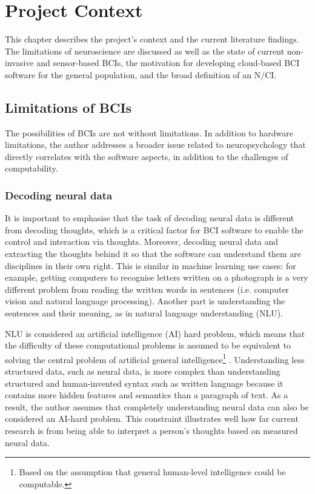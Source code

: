\chapter{Project Context}
\graphicspath{{Chapter2/Figs/}{Chapter2/Figs/}}

This chapter describes the project’s context and the current literature findings. The limitations of neuroscience are discussed as well as the state of current non-invasive and sensor-based BCIs, the motivation for developing cloud-based BCI software for the general population, and the broad definition of an N/CI.

\section{Limitations of BCIs}
\label{chapter2-limitations-of-bcis}

The possibilities of BCIs are not without limitations. In addition to hardware limitations, the author addresses a broader issue related to neuropsychology that directly correlates with the software aspects, in addition to the challenges of computability.

\subsection{Decoding neural data}
\label{chapter2-decoding-neural-data}

It is important to emphasise that the task of decoding neural data is different from decoding thoughts, which is a critical factor for BCI software to enable the control and interaction via thoughts. Moreover, decoding neural data and extracting the thoughts behind it so that the software can understand them are disciplines in their own right. This is similar in machine learning use cases: for example, getting computers to recognise letters written on a photograph is a very different problem from reading the written words in sentences (i.e. computer vision and natural language processing). Another part is understanding the sentences and their meaning, as in natural language understanding (NLU).

NLU is considered an artificial intelligence (AI) hard problem, which means that the difficulty of these computational problems is assumed to be equivalent to solving the central problem of artificial general intelligence\footnote{Based on the assumption that general human-level intelligence could be computable.} \citep{demasi_theoretical_2010}. Understanding less structured data, such as neural data, is more complex than understanding structured and human-invented syntax such as written language because it contains more hidden features and semantics than a paragraph of text. As a result, the author assumes that completely understanding neural data can also be considered an AI-hard problem. This constraint illustrates well how far current research is from being able to interpret a person's thoughts based on measured neural data.

